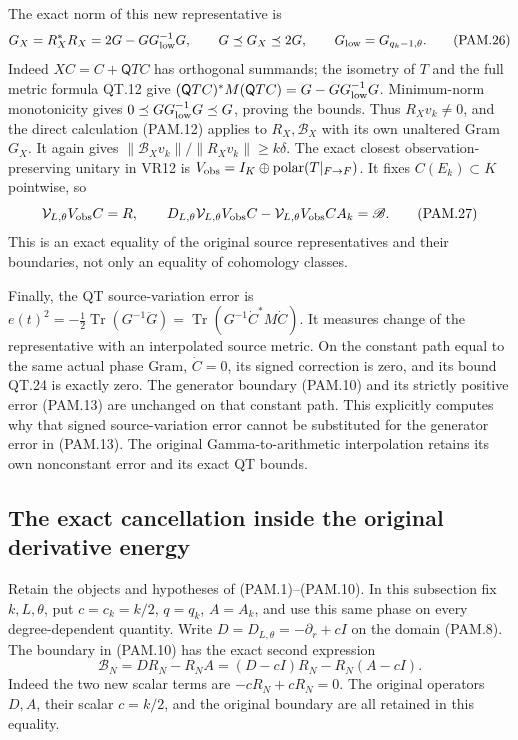 The exact norm of this new representative is
\[
 G_X=R_X^*R_X
       =2G-GG_{\rm low}^{-1}G,\qquad
 G\preceq G_X\preceq2G,\qquad
 G_{\rm low}=G_{q_k-1,\theta}.
 \tag{PAM.26}\label{eq:pam-repairgram}
\]
Indeed \(XC=C+\mathsf QTC\) has orthogonal summands; the
isometry of \(T\) and the full metric formula QT.12 give
\((\mathsf QTC)^*M(\mathsf QTC)=G-GG_{\rm low}^{-1}G\).
Minimum-norm monotonicity gives
\(0\preceq GG_{\rm low}^{-1}G\preceq G\), proving the bounds.
Thus \(R_Xv_k\ne0\), and the direct calculation (PAM.12) applies
to \(R_X,\mathscr B_X\) with its own unaltered Gram \(G_X\).
It again gives
\(\|\mathscr B_Xv_k\|/\|R_Xv_k\|\ge k\delta\).
The exact closest observation-preserving unitary in VR12 is
\(V_{\rm obs}=I_K\oplus\operatorname{polar}(T|_{F\to F})\).
It fixes \(C(E_k)\subset K\) pointwise, so
\[
 \mathcal V_{L,\theta}V_{\rm obs}C=R,\qquad
 D_{L,\theta}\mathcal V_{L,\theta}V_{\rm obs}C
       -\mathcal V_{L,\theta}V_{\rm obs}CA_k=\mathscr B .
 \tag{PAM.27}\label{eq:pam-unitary}
\]
This is an exact equality of the original source representatives
and their boundaries, not only an equality of cohomology classes.

Finally, the QT source-variation error is
\(e(t)^2=-\tfrac12\operatorname{Tr}(G^{-1}\ddot G)
=\operatorname{Tr}(G^{-1}\dot C^*M\dot C)\).
It measures change of the representative with an interpolated
source metric. On the constant path equal to the same actual
phase Gram, \(\dot C=0\), its signed correction is zero, and its
bound QT.24 is exactly zero. The generator boundary (PAM.10)
and its strictly positive error (PAM.13) are unchanged on that
constant path. This explicitly computes why that signed
source-variation error cannot be substituted for the generator
error in (PAM.13). The original Gamma-to-arithmetic interpolation
retains its own nonconstant error and its exact QT bounds.

\subsection{The exact cancellation inside the original derivative energy}
\label{sec:psc-centered}

Retain the objects and hypotheses of (PAM.1)--(PAM.10). In this
subsection fix \(k,L,\theta\), put \(c=c_k=k/2\), \(q=q_k\),
\(A=A_k\), and use this same phase on every degree-dependent
quantity. Write \(D=D_{L,\theta}=-\partial_r+cI\) on the domain
(PAM.8). The boundary in (PAM.10) has the exact second expression
\[
 \mathscr B_N=DR_N-R_NA
       =(D-cI)R_N-R_N(A-cI).
 \tag{PSC.1}\label{eq:psc-centeredboundary}
\]
Indeed the two new scalar terms are \(-cR_N+cR_N=0\).
The original operators \(D,A\), their scalar \(c=k/2\), and
the original boundary are all retained in this equality.

